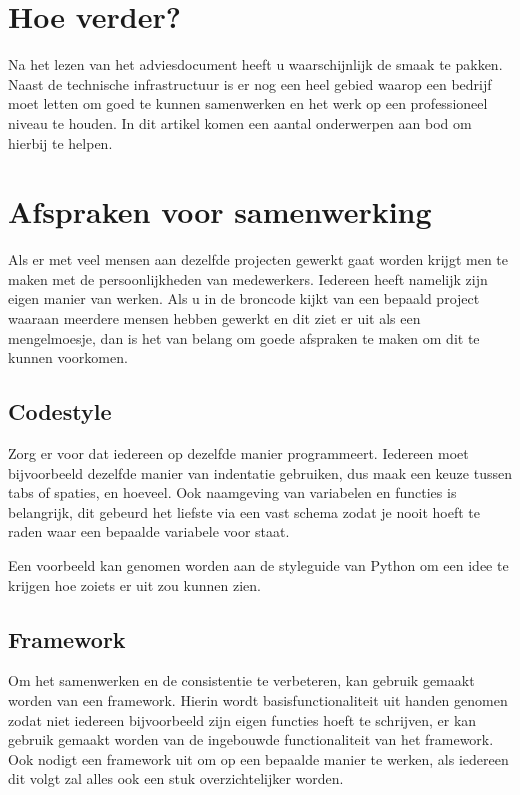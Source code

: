 \documentclass[12pt, a4paper]{article}
\begin{document}
\section*{Hoe verder?}

Na het lezen van het adviesdocument heeft u waarschijnlijk de smaak te pakken. Naast de technische infrastructuur is er nog een heel gebied waarop een bedrijf moet letten om goed te kunnen samenwerken en het werk op een professioneel niveau te houden. In dit artikel komen een aantal onderwerpen aan bod om hierbij te helpen.

\section{Afspraken voor samenwerking}

Als er met veel mensen aan dezelfde projecten gewerkt gaat worden krijgt men te maken met de persoonlijkheden van medewerkers. Iedereen heeft namelijk zijn eigen manier van werken. Als u in de broncode kijkt van een bepaald project waaraan meerdere mensen hebben gewerkt en dit ziet er uit als een mengelmoesje, dan is het van belang om goede afspraken te maken om dit te kunnen voorkomen.

\subsection{Codestyle}

Zorg er voor dat iedereen op dezelfde manier programmeert. Iedereen moet bijvoorbeeld dezelfde manier van indentatie gebruiken, dus maak een keuze tussen tabs of spaties, en hoeveel. Ook naamgeving van variabelen en functies is belangrijk, dit gebeurd het liefste via een vast schema zodat je nooit hoeft te raden waar een bepaalde variabele voor staat.

Een voorbeeld kan genomen worden aan de styleguide van Python\cite{python} om een idee te krijgen hoe zoiets er uit zou kunnen zien.

\subsection{Framework}

Om het samenwerken en de consistentie te verbeteren, kan gebruik gemaakt worden van een framework. Hierin wordt basisfunctionaliteit uit handen genomen zodat niet iedereen bijvoorbeeld zijn eigen functies hoeft te schrijven, er kan gebruik gemaakt worden van de ingebouwde functionaliteit van het framework. Ook nodigt een framework uit om op een bepaalde manier te werken, als iedereen dit volgt zal alles ook een stuk overzichtelijker worden.
\end{document}

